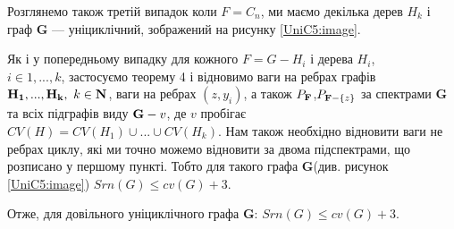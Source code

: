 Розглянемо також третій випадок коли $F=C_n$, ми маємо декілька дерев $H_k$ і граф \textbf{G} --- уніциклічний, зображений на рисунку \ref{UniC5:image}.

Як і у попередньому випадку для кожного $F =  G - H_i$ і дерева $H_i$,\\ $i \in 1,...,k$, застосуємо теорему 4 і відновимо ваги на ребрах графів ${\bf H_1,...,H_k},\\ \ k\in \mathbf{N}$, ваги на ребрах $(z,y_i)$, а також $P_{\bf F}$,$P_{{\bf F}-\{z\}}$ за спектрами \textbf{G} та всіх підграфів виду ${\bf G} - v$, де $v$ пробігає $CV(H) = CV(H_1) \cup ... \cup CV(H_k)$. Нам також необхідно відновити ваги не ребрах циклу, які ми точно можемо відновити за двома підспектрами, що розписано у першому пункті. Тобто для такого графа \textbf{G}(див. рисунок \ref{UniC5:image}) $Srn({G}) \leq cv(G)+3$.

Отже, для довільного уніциклічного графа \textbf{G}: $Srn({G}) \leq cv({G})+3$.